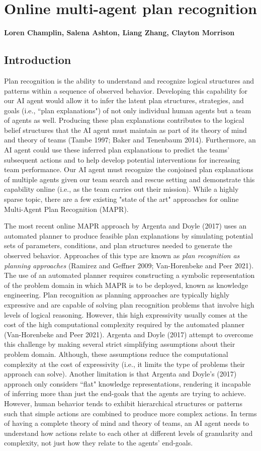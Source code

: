 \chapter{Online multi-agent plan recognition}
\textbf{Loren Champlin, Salena Ashton, Liang Zhang, Clayton Morrison}
\section{Introduction}
Plan recognition is the ability to understand and recognize logical structures and patterns within a sequence of observed behavior. Developing this capability for our AI agent would allow it to infer the latent plan structures, strategies, and goals (i.e., ``plan explanations") of not only individual human agents but a team of agents as well. Producing these plan explanations contributes to the logical belief structures that the AI agent must maintain as part of its theory of mind and theory of teams (Tambe 1997; Baker and Tenenbaum 2014). Furthermore, an AI agent could use these inferred plan explanations to predict the teams' subsequent actions and to help develop potential interventions for increasing team performance. Our AI agent must recognize the conjoined plan explanations of multiple agents given our team search and rescue setting and demonstrate this capability online (i.e., as the team carries out their mission). While a highly sparse topic, there are a few existing "state of the art" approaches for online Multi-Agent Plan Recognition (MAPR). 

The most recent online MAPR approach by Argenta and Doyle (2017) uses an automated planner to produce feasible plan explanations by simulating potential sets of parameters, conditions, and plan structures needed to generate the observed behavior. Approaches of this type are known as \textit{plan recognition as planning approaches} (Ramirez and Geffner 2009; Van-Horenbeke and Peer 2021). The use of an automated planner requires constructing a symbolic representation of the problem domain in which MAPR is to be deployed, known as knowledge engineering. Plan recognition as planning approaches are typically highly expressive and are capable of solving plan recognition problems that involve high levels of logical reasoning. However, this high expressivity usually comes at the cost of the high computational complexity required by the automated planner (Van-Horenbeke and Peer 2021). Argenta and Doyle (2017) attempt to overcome this challenge by making several strict simplifying assumptions about their problem domain. Although, these assumptions reduce the computational complexity at the cost of expressivity (i.e., it limits the type of problems their approach can solve). Another limitation is that Argenta and Doyle's (2017) approach only considers ``flat" knowledge representations, rendering it incapable of inferring more than just the end-goals that the agents are trying to achieve. However, human behavior tends to exhibit hierarchical structures or patterns such that simple actions are combined to produce more complex actions. In terms of having a complete theory of mind and theory of teams, an AI agent needs to understand how actions relate to each other at different levels of granularity and complexity, not just how they relate to the agents' end-goals. 


